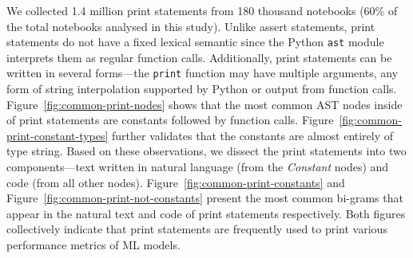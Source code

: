 We collected 1.4 million print statements from 180 thousand notebooks (60\% of the total notebooks analysed in this study). Unlike assert statements, print statements do not have a fixed lexical semantic since the Python \lstinline{ast} module interprets them as regular function calls. Additionally, print statements can be written in several forms---the \lstinline{print} function may have multiple arguments, any form of string interpolation supported by Python or output from function calls. Figure~\ref{fig:common-print-nodes} shows that the most common AST nodes inside of print statements are constants followed by function calls. Figure~\ref{fig:common-print-constant-types} further validates that the constants are almost entirely of type string. Based on these observations, we dissect the print statements into two components---text written in natural language (from the \emph{Constant} nodes) and code (from all other nodes). Figure~\ref{fig:common-print-constants} and Figure~\ref{fig:common-print-not-constants} present the most common bi-grams that appear in the natural text and code of print statements respectively. Both figures collectively indicate that print statements are frequently used to print various performance metrics of ML models.


